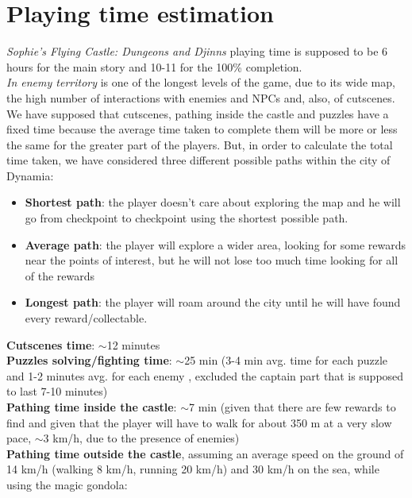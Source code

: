\section{Playing time estimation}
\textit{Sophie's Flying Castle: Dungeons and Djinns} playing time is supposed to be 6 hours for the main story and 10-11 for the 100\% completion.\\
\textit{In enemy territory} is one of the longest levels of the game, due to its wide map, the high number of interactions with enemies and NPCs and, also, of cutscenes.
We have supposed that cutscenes, pathing inside the castle and puzzles have a fixed time because the average time taken to complete them will be more or less the same for the greater part of the players. But, in order to calculate the total time taken, we have considered three different possible paths within the city of Dynamia:
\begin{itemize}
\item \textbf{Shortest path}: the player doesn't care about exploring the map and he will go from checkpoint to checkpoint using the shortest possible path.
\item \textbf{Average path}: the player will explore a wider area, looking for some rewards near the points of interest, but he will not lose too much time looking for all of the rewards
\item \textbf{Longest path}: the player will roam around the city until he will have found every reward/collectable.
\end{itemize}
\textbf{Cutscenes time}: $\sim$12 minutes\\
\textbf{Puzzles solving/fighting time}: $\sim$25 min (3-4 min avg. time for each puzzle and 1-2 minutes avg. for each enemy , excluded the captain part that is supposed to last 7-10 minutes)\\
\textbf{Pathing time inside the castle}: $\sim$7 min (given that there are few rewards to find and given that the player will have to walk for about 350 m at a very slow pace, $\sim$3 km/h, due to the presence of enemies)\\
\textbf{Pathing time outside the castle}, assuming an average speed on the ground of 14 km/h (walking 8 km/h, running 20 km/h) and 30 km/h on the sea, while using the magic gondola:\\
